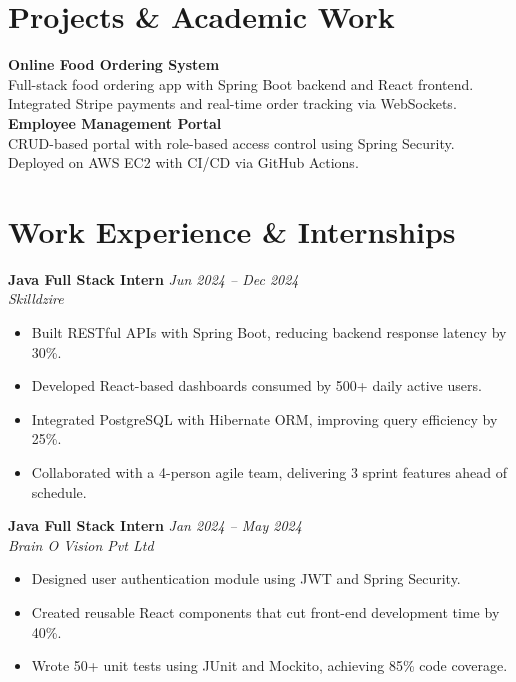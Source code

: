 \documentclass[11pt, letterpaper]{article}
\begin{document}
\section*{Projects \& Academic Work}
\textbf{Online Food Ordering System} \\
Full-stack food ordering app with Spring Boot backend and React frontend. Integrated Stripe payments and real-time order tracking via WebSockets.
\vspace{0.5em}
\textbf{Employee Management Portal} \\
CRUD-based portal with role-based access control using Spring Security. Deployed on AWS EC2 with CI/CD via GitHub Actions.
\vspace{0.5em}

\section*{Work Experience \& Internships}
\textbf{Java Full Stack Intern} \hfill \textit{Jun 2024 – Dec 2024} \\
\textit{\color{secondary}Skilldzire}
\vspace{-0.5em}
\begin{itemize}[leftmargin=*, noitemsep]
    \item Built RESTful APIs with Spring Boot, reducing backend response latency by 30\%.
    \item Developed React-based dashboards consumed by 500+ daily active users.
    \item Integrated PostgreSQL with Hibernate ORM, improving query efficiency by 25\%.
    \item Collaborated with a 4-person agile team, delivering 3 sprint features ahead of schedule.
\end{itemize}
\vspace{0.5em}
\textbf{Java Full Stack Intern} \hfill \textit{Jan 2024 – May 2024} \\
\textit{\color{secondary}Brain O Vision Pvt Ltd}
\vspace{-0.5em}
\begin{itemize}[leftmargin=*, noitemsep]
    \item Designed user authentication module using JWT and Spring Security.
    \item Created reusable React components that cut front-end development time by 40\%.
    \item Wrote 50+ unit tests using JUnit and Mockito, achieving 85\% code coverage.
\end{itemize}
\vspace{0.5em}
\end{document}
